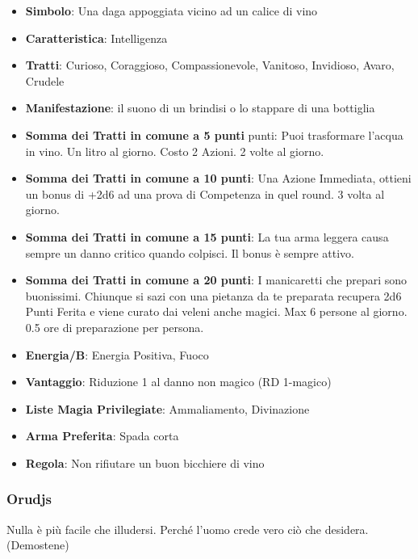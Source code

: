 \begin{multicols}{2}
\begin{itemize}[leftmargin=*] \setlength{\itemsep}{0pt}
\item \textbf{Simbolo}: Una daga appoggiata vicino ad un calice di vino
\item \textbf{Caratteristica}: Intelligenza
\item \textbf{Tratti}: Curioso, Coraggioso, Compassionevole, Vanitoso, Invidioso, Avaro, Crudele
\item \textbf{Manifestazione}: il suono di un brindisi o lo stappare di una bottiglia
\item \textbf{Somma dei Tratti in comune a 5 punti} punti: Puoi trasformare l'acqua in vino. Un litro al giorno. Costo 2 Azioni. 2 volte al giorno.
\item \textbf{Somma dei Tratti in comune a 10 punti}: Una Azione Immediata, ottieni un bonus di +2d6 ad una prova di Competenza in quel round. 3 volta al giorno.
\item \textbf{Somma dei Tratti in comune a 15 punti}: La tua arma leggera causa sempre un danno critico quando colpisci. Il bonus è sempre attivo.
\item \textbf{Somma dei Tratti in comune a 20 punti}: I manicaretti che prepari sono buonissimi. Chiunque si sazi con una pietanza da te preparata recupera 2d6 Punti Ferita e viene curato dai veleni anche magici. Max 6 persone al giorno. 0.5 ore di preparazione per persona.
\item \textbf{Energia/B}: Energia Positiva, Fuoco
\item \textbf{Vantaggio}: Riduzione 1 al danno non magico (RD 1-magico)
\item \textbf{Liste Magia Privilegiate}: Ammaliamento, Divinazione
\item \textbf{Arma Preferita}: Spada corta
\item \textbf{Regola}: Non rifiutare un buon bicchiere di vino
\end{itemize}

\subsubsection{Orudjs}\label{orudjs}\hypertarget{orudjs}{}

\begin{changemargin}{0.3cm}{0.3cm}\begin{enfasi}{
Nulla è più facile che illudersi. Perché l'uomo crede vero ciò che desidera. (Demostene)
}\end{enfasi}\end{changemargin}\medskip


\end{multicols}
